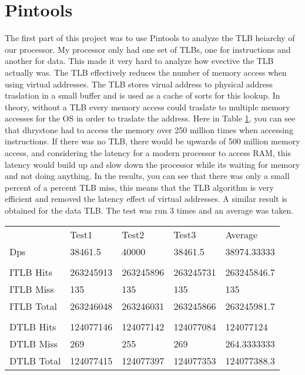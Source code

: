 \documentclass{article}
\begin{document}
	\section{Pintools}
		The first part of this project was to use Pintools to analyze the TLB heiarchy of our processor. My processor only had one set of TLBs, one for instructions and another for data. This made it very hard to analyze how evective the TLB actually was. The TLB effectively reduces the number of memory access when using virtual addresses. The TLB stores virual address to physical address traslation in a small buffer and is used as a cache of sorts for this lookup. In theory, without a TLB every memory access could traslate to multiple memory accesses for the OS in order to traslate the address. Here in Table \ref{tlb:table}, you can see that dhrystone had to access the memory over 250 million times when accessing instructions. If there was no TLB, there would be upwards of 500 million memory access, and considering the latency for a modern processor to access RAM, this latency would build up and slow down the processor while its waiting for memory and not doing anything. In the results, you can see that there was only a small percent of a percent TLB miss, this means that the TLB algorithm is very efficient and removed the latency effect of virtual addresses. A similar result is obtained for the data TLB. The test was run 3 times and an average was taken. 
		\begin{table}[H]
			\label{tlb:table}
			\centering 
			\begin{tabular}{lllll}
				    & Test1 & Test2 & Test3 & Average \\ 
				Dps & 38461.5 & 40000 & 38461.5 & 38974.33333 \\ 
				& & & & \\
				ITLB Hits & 263245913 & 263245896 & 263245731 & 263245846.7 \\
				ITLB Miss & 135 & 135 & 135 & 135 \\
				ITLB Total & 263246048 & 263246031 & 263245866 & 263245981.7 \\
				& & & & \\
				DTLB Hits & 124077146 & 124077142 & 124077084 & 124077124 \\
				DTLB Miss & 269 & 255 & 269 & 264.3333333 \\
				DTLB Total & 124077415 & 124077397 & 124077353 & 124077388.3
			\end{tabular}
		\end{table}
\end{document}
